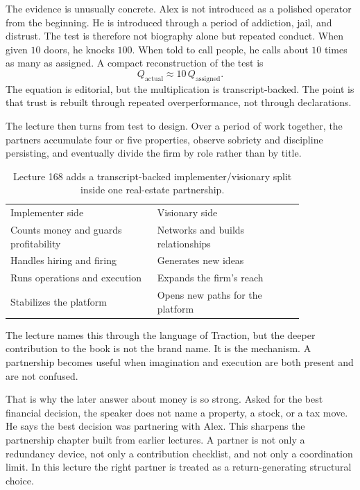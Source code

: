 \documentclass[11pt,oneside]{book}
\begin{document}
The evidence is unusually concrete. Alex is not introduced as a polished operator from the beginning. He is introduced through a period of addiction, jail, and distrust. The test is therefore not biography alone but repeated conduct. When given \(10\) doors, he knocks \(100\). When told to call people, he calls about \(10\) times as many as assigned. A compact reconstruction of the test is
\begin{equation}
Q_{\mathrm{actual}} \approx 10\,Q_{\mathrm{assigned}}.
\end{equation}
The equation is editorial, but the multiplication is transcript-backed. The point is that trust is rebuilt through repeated overperformance, not through declarations.

The lecture then turns from test to design. Over a period of work together, the partners accumulate four or five properties, observe sobriety and discipline persisting, and eventually divide the firm by role rather than by title.

\begin{table}[h]
\centering
\begin{tabular}{p{0.42\linewidth}p{0.42\linewidth}}
Implementer side & Visionary side \\
Counts money and guards profitability & Networks and builds relationships \\
Handles hiring and firing & Generates new ideas \\
Runs operations and execution & Expands the firm's reach \\
Stabilizes the platform & Opens new paths for the platform \\
\end{tabular}
\caption{Lecture 168 adds a transcript-backed implementer/visionary split inside one real-estate partnership.}
\end{table}

The lecture names this through the language of Traction, but the deeper contribution to the book is not the brand name. It is the mechanism. A partnership becomes useful when imagination and execution are both present and are not confused.

That is why the later answer about money is so strong. Asked for the best financial decision, the speaker does not name a property, a stock, or a tax move. He says the best decision was partnering with Alex. This sharpens the partnership chapter built from earlier lectures. A partner is not only a redundancy device, not only a contribution checklist, and not only a coordination limit. In this lecture the right partner is treated as a return-generating structural choice.
\end{document}
